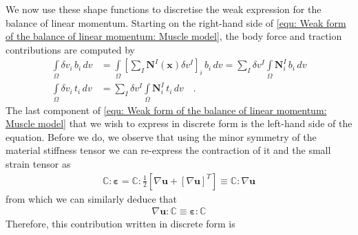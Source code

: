\documentclass[]{scrartcl}
\begin{document}
We now use these shape functions to discretise the weak expression for the balance of linear momentum.
Starting on the right-hand side of \cref{equ: Weak form of the balance of linear momentum: Muscle model}, the body force and traction contributions are computed by
\begin{align}
\int\limits_{\Omega} \delta v_{i} \, b_{i} \, dv
  &= \int\limits_{\Omega} \left[ \sum\limits_{I} \mathbf{N}^{I} \left( \mathbf{x} \right) \delta v^{I} \right]_{i} \, b_{i} \, dv
   = \sum\limits_{I} \delta v^{I} \int\limits_{\Omega} \mathbf{N}^{I}_{i} \, b_{i} \, dv 
\label{equ: Discretisation: Body force}
\\
\int\limits_{\Omega} \delta v_{i} \, t_{i} \, dv
  &= \sum\limits_{I} \delta v^{I} \int\limits_{\Omega} \mathbf{N}^{I}_{i} \, t_{i} \, dv 
\label{equ: Discretisation: Traction}
\quad .
\end{align}
The last component of \cref{equ: Weak form of the balance of linear momentum: Muscle model} that we wish to express in discrete form is the left-hand side of the equation.
Before we do, we observe that using the minor symmetry of the material stiffness tensor we can re-express the contraction of it and the small strain tensor as
\begin{gather}
\boldsymbol{\mathbb{C}} : \boldsymbol{\varepsilon}
  = \boldsymbol{\mathbb{C}} : \frac{1}{2} \left[ \nabla \mathbf{u} + \left[ \nabla \mathbf{u} \right]^{T} \right]
  \equiv \boldsymbol{\mathbb{C}} : \nabla \mathbf{u}
\end{gather}
from which we can similarly deduce that
\begin{gather}
\nabla \mathbf{u} : \boldsymbol{\mathbb{C}}
  \equiv \boldsymbol{\varepsilon} : \boldsymbol{\mathbb{C}}
\end{gather}
Therefore, this contribution written in discrete form is
\end{document}
